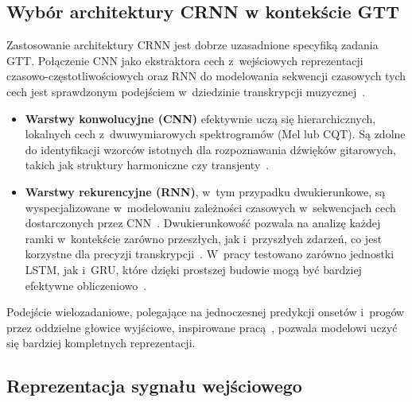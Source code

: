 \subsection{Wybór architektury CRNN w kontekście GTT}
\label{ssec:analiza_crnn_teoretyczna_fakt}

Zastosowanie architektury CRNN jest dobrze uzasadnione specyfiką zadania GTT. Połączenie CNN jako ekstraktora cech z~wejściowych reprezentacji czasowo-częstotliwościowych oraz RNN do modelowania sekwencji czasowych tych cech jest sprawdzonym podejściem w~dziedzinie transkrypcji muzycznej~\autocite{Hawthorne2018Onsets, Wiggins2019TabCNN}.
\begin{itemize}
    \item \textbf{Warstwy konwolucyjne (CNN)} efektywnie uczą się hierarchicznych, lokalnych cech z~dwuwymiarowych spektrogramów (Mel lub CQT). Są zdolne do identyfikacji wzorców istotnych dla rozpoznawania dźwięków gitarowych, takich jak struktury harmoniczne czy transjenty~\autocite{Wiggins2019TabCNN, Benetos2019AutomaticMusicTranscription}.
    \item \textbf{Warstwy rekurencyjne (RNN)}, w~tym przypadku dwukierunkowe, są wyspecjalizowane w~modelowaniu zależności czasowych w~sekwencjach cech dostarczonych przez CNN~\autocite{Benetos2019AutomaticMusicTranscription}. Dwukierunkowość pozwala na analizę każdej ramki w~kontekście zarówno przeszłych, jak i~przyszłych zdarzeń, co jest korzystne dla precyzji transkrypcji~\autocite{Hawthorne2018Onsets}. W~pracy testowano zarówno jednostki LSTM, jak i~GRU, które dzięki prostszej budowie mogą być bardziej efektywne obliczeniowo~\autocite{Chung2014GRU}.
\end{itemize}
Podejście wielozadaniowe, polegające na jednoczesnej predykcji onsetów i~progów przez oddzielne głowice wyjściowe, inspirowane pracą~\autocite{Hawthorne2018Onsets}, pozwala modelowi uczyć się bardziej kompletnych reprezentacji.

\subsection{Reprezentacja sygnału wejściowego}
\label{ssec:analiza_reprezentacji_teoretyczna_fakt}

